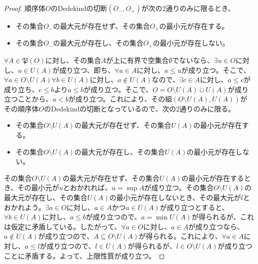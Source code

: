 \documentclass[dvipdfmx]{jsarticle}
\begin{document}
\begin{proof}
順序体$O$のDedekindの切断$\left( O_{-},O_{+} \right)$が次の2通りのみに限るとき、
\begin{itemize}
\item
  その集合$O_{-}$の最大元が存在せず、その集合$O_{+}$の最小元が存在する。
\item
  その集合$O_{-}$の最大元が存在し、その集合$O_{+}$の最小元が存在しない。
\end{itemize}
$\forall A \in \mathfrak{P}(O)$に対し、その集合$A$が上に有界で空集合$\emptyset$でないなら、$\exists u \in O$に対し、$u \in U(A)$が成り立つ、即ち、$\forall a \in A$に対し、$a \leq u$が成り立つ。そこで、$\forall a \in O \setminus U(A)\forall b \in U(A)$に対し、$a \notin U(A)$なので、$\exists c \in A$に対し、$a \leq c$が成り立ち、$c \leq b$より$a \leq b$が成り立つ。そこで、$O = O \setminus U(A) \sqcup U(A)$が成り立つことから、$a < b$が成り立つ。これにより、その組$\left( O \setminus U(A),U(A) \right)$がその順序体$O$のDedekindの切断となっているので、次の2通りのみに限る。
\begin{itemize}
\item
  その集合$O \setminus U(A)$の最大元が存在せず、その集合$U(A)$の最小元が存在する。
\item
  その集合$O \setminus U(A)$の最大元が存在し、その集合$U(A)$の最小元が存在しない。
\end{itemize}
その集合$O \setminus U(A)$の最大元が存在せず、その集合$U(A)$の最小元が存在するとき、その最小元が$u$とおかれれば、$u = \sup A$が成り立つ。その集合$O \setminus U(A)$の最大元が存在し、その集合$U(A)$の最小元が存在しないとき、その最大元が$l$とおかれよう。$\exists a \in O$に対し、$a \in A$かつ$a \in U(A)$が成り立つとすると、$\forall b \in U(A)$に対し、$a \leq b$が成り立つので、$a = \min{U(A)}$が得られるが、これは仮定に矛盾している。したがって、$\forall a \in O$に対し、$a \in A$が成り立つなら、$a \notin U(A)$が成り立つので、$A \subseteq O \setminus U(A)$が得られる。これにより、$\forall a \in A$に対し、$a \leq l$が成り立つので、$l \in U(A)$が得られるが、$l \in O \setminus U(A)$が成り立つことに矛盾する。よって、上限性質が成り立つ。\par

\end{proof}
\end{document}
